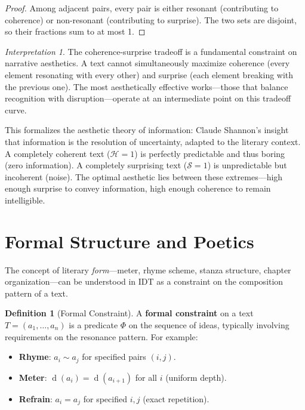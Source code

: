 \documentclass[11pt,openany]{book}
\theoremstyle{definition}
\newtheorem{definition}[axiom]{Definition}
\theoremstyle{plain}
\theoremstyle{remark}
\newtheorem{interpretation}[axiom]{Interpretation}
\newcommand{\res}{\sim}                      %
\newcommand{\depth}{\operatorname{d}}       %
\begin{document}
\begin{proof}
Among adjacent pairs, every pair is either resonant (contributing to coherence) or non-resonant (contributing to surprise). The two sets are disjoint, so their fractions sum to at most 1.
\end{proof}

\begin{interpretation}
The coherence-surprise tradeoff is a fundamental constraint on narrative aesthetics. A text cannot simultaneously maximize coherence (every element resonating with every other) and surprise (each element breaking with the previous one). The most aesthetically effective works---those that balance recognition with disruption---operate at an intermediate point on this tradeoff curve.

This formalizes the aesthetic theory of information: Claude Shannon's insight that information is the resolution of uncertainty, adapted to the literary context. A completely coherent text ($\mathcal{H} = 1$) is perfectly predictable and thus boring (zero information). A completely surprising text ($\mathcal{S} = 1$) is unpredictable but incoherent (noise). The optimal aesthetic lies between these extremes---high enough surprise to convey information, high enough coherence to remain intelligible.
\end{interpretation}

\section{Formal Structure and Poetics}

The concept of literary \emph{form}---meter, rhyme scheme, stanza structure, chapter organization---can be understood in IDT as a constraint on the composition pattern of a text.

\begin{definition}[Formal Constraint]
A \textbf{formal constraint} on a text $T = (a_1, \ldots, a_n)$ is a predicate $\Phi$ on the sequence of ideas, typically involving requirements on the resonance pattern. For example:
\begin{itemize}
\item \textbf{Rhyme}: $a_i \res a_j$ for specified pairs $(i, j)$.
\item \textbf{Meter}: $\depth(a_i) = \depth(a_{i+1})$ for all $i$ (uniform depth).
\item \textbf{Refrain}: $a_i = a_j$ for specified $i, j$ (exact repetition).
\end{itemize}
\end{definition}
\end{document}
